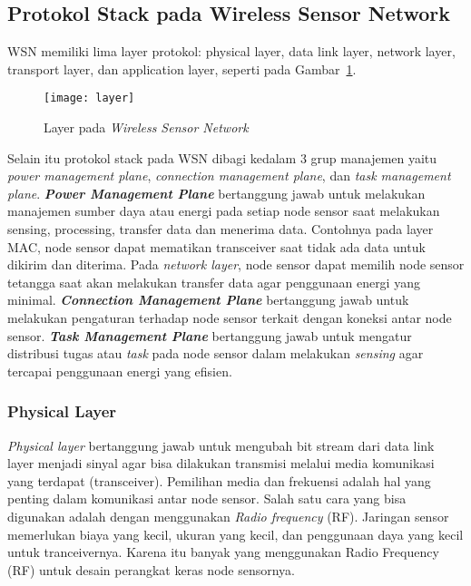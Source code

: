 \subsection{Protokol Stack pada Wireless Sensor Network}
WSN memiliki lima layer protokol: physical layer, data link layer, network layer, transport layer, dan application layer, seperti pada Gambar~\ref{fig:layer}. 

\begin{figure} [H]
	\centering  
	\texttt{[image: layer]}  
	\caption[Layer pada \textit{Wireless Sensor Network}]{Layer pada \textit{Wireless Sensor Network}} 
	\label{fig:layer} 
\end{figure} 

Selain itu protokol stack pada WSN dibagi kedalam 3 grup manajemen yaitu \textit{power management plane}, \textit{connection management plane}, dan \textit{task management plane}. \textbf{\textit{Power Management Plane}} bertanggung jawab untuk melakukan manajemen sumber daya atau energi pada setiap node sensor saat melakukan sensing, processing, transfer data dan menerima data. Contohnya pada layer MAC, node sensor dapat mematikan transceiver saat tidak ada data untuk dikirim dan diterima. Pada \textit{network layer}, node sensor dapat memilih node sensor tetangga saat akan melakukan transfer data agar penggunaan energi yang minimal. \textbf{\textit{Connection Management Plane}} bertanggung jawab untuk melakukan pengaturan terhadap node sensor terkait dengan koneksi antar node sensor. \textbf{\textit{Task Management Plane}} bertanggung jawab untuk mengatur distribusi tugas atau \textit{task} pada node sensor dalam melakukan \textit{sensing} agar tercapai penggunaan energi yang efisien.

\subsubsection{Physical Layer}
\textit{Physical layer} bertanggung jawab untuk mengubah bit stream dari data link layer menjadi sinyal agar bisa dilakukan transmisi melalui media komunikasi yang terdapat (transceiver). Pemilihan media dan frekuensi adalah hal yang penting dalam komunikasi antar node sensor. Salah satu cara yang bisa digunakan adalah dengan menggunakan \textit{Radio frequency} (RF). Jaringan sensor memerlukan biaya yang kecil, ukuran yang kecil, dan penggunaan daya yang kecil untuk tranceivernya. Karena itu banyak yang menggunakan Radio Frequency (RF) untuk desain perangkat keras node sensornya.

